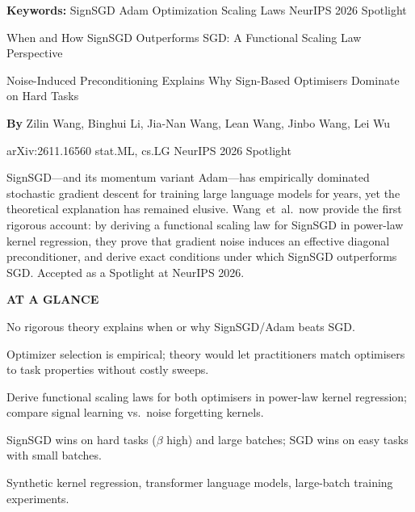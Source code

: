 \documentclass[10pt,twocolumn]{article}
\begin{document}
\setlength{\parindent}{0pt}
\setlength{\parskip}{4pt}

{\small\color{keywordgray}\textbf{Keywords:}
  SignSGD \textbullet{} Adam \textbullet{} Optimization \textbullet{} Scaling Laws \textbullet{} NeurIPS 2026 Spotlight}\par\vspace{4pt}

{\LARGE\bfseries\raggedright When and How SignSGD Outperforms SGD: A Functional Scaling Law Perspective}\par\vspace{4pt}
{\large\itshape\raggedright Noise-Induced Preconditioning Explains Why Sign-Based Optimisers Dominate on Hard Tasks}\par\vspace{6pt}
{\small\textbf{By} Zilin Wang, Binghui Li, Jia-Nan Wang, Lean Wang, Jinbo Wang, Lei Wu}\par\vspace{2pt}
{\small\color{keywordgray}arXiv:2611.16560 \textbullet{} stat.ML, cs.LG \textbullet{} NeurIPS 2026 Spotlight}
\par\vspace{2pt}\noindent{\color{rulered}\rule{\columnwidth}{0.6pt}}\vspace{6pt}

SignSGD---and its momentum variant Adam---has empirically dominated stochastic gradient descent for training large language models for years, yet the theoretical explanation has remained elusive.
Wang~et~al.\ now provide the first rigorous account: by deriving a functional scaling law for SignSGD in power-law kernel regression, they prove that gradient noise induces an effective diagonal preconditioner, and derive exact conditions under which SignSGD outperforms SGD.
Accepted as a Spotlight at NeurIPS 2026.

\begin{mdframed}[backgroundcolor=boxgray,linecolor=rulered,linewidth=1pt,
    innerleftmargin=6pt,innerrightmargin=6pt,
    innertopmargin=6pt,innerbottommargin=6pt]
\textbf{\small AT A GLANCE}\par\vspace{4pt}
\begin{description}[leftmargin=0pt,labelsep=4pt,itemsep=2pt,parsep=0pt,
    font=\small\bfseries]
  \item[Problem:] No rigorous theory explains when or why SignSGD/Adam beats SGD.
  \item[Why it matters:] Optimizer selection is empirical; theory would let practitioners match optimisers to task properties without costly sweeps.
  \item[Method:] Derive functional scaling laws for both optimisers in power-law kernel regression; compare signal learning vs.\ noise forgetting kernels.
  \item[Result:] SignSGD wins on hard tasks ($\beta$ high) and large batches; SGD wins on easy tasks with small batches.
  \item[Evidence:] Synthetic kernel regression, transformer language models, large-batch training experiments.
\end{description}
\end{mdframed}
\end{document}

